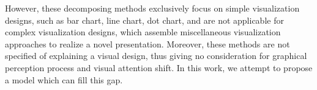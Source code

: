 However, these decomposing methods exclusively focus on simple visualization designs, such as bar chart, line chart, dot chart, and are not applicable for complex visualization designs, which assemble miscellaneous visualization approaches to realize a novel presentation. Moreover, these methods are not specified of explaining a visual design, thus giving no consideration for graphical perception process and visual attention shift. In this work, we attempt to propose a model which can fill this gap.

